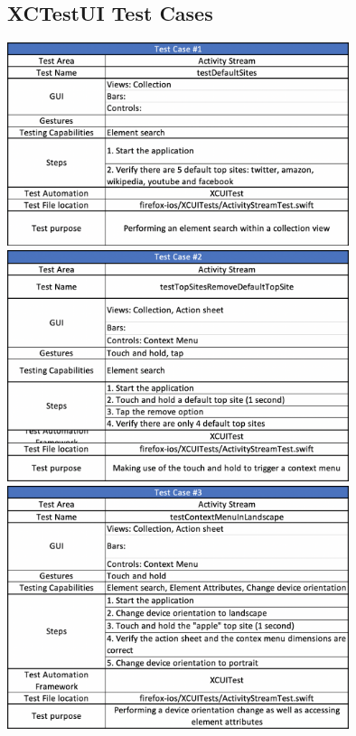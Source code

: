 \subsection{XCTestUI Test Cases}
\includegraphics[width=10cm]{img/tc1.png} \\[2mm]
\includegraphics[width=10cm]{img/tc2.png} \\[2mm]
\includegraphics[width=10cm]{img/tc3.png} \\[2mm]
